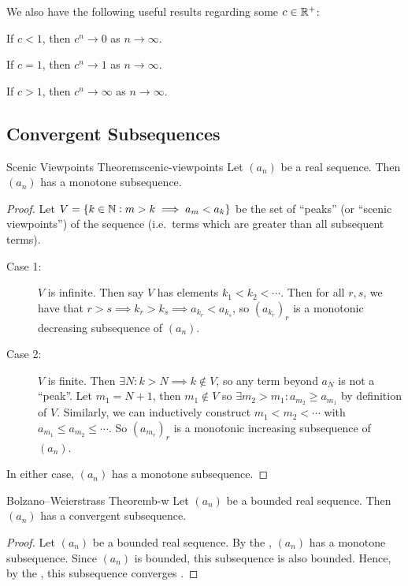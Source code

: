 \documentclass{styles/tufte}
\begin{document}
    \begin{lemma}{}{}
      We also have the following useful results regarding some $c \in \mathbb{R}^+$:
      \begin{romanenum}
        \item If $c < 1$, then $c^n \to 0$ as $n \to \infty$.
        \item If $c = 1$, then $c^n \to 1$ as $n \to \infty$.
        \item If $c > 1$, then $c^n \to \infty$ as $n \to \infty$.
      \end{romanenum}
    \end{lemma}

  
  
  \subsection{Convergent Subsequences}
    
    \begin{theorem}{Scenic Viewpoints Theorem}{scenic-viewpoints}
      Let $(a_n)$ be a real sequence. Then $(a_n)$ has a monotone subsequence.
    \end{theorem}
    \begin{proof}
      Let $V = \set{k \in \mathbb{N}: m > k \implies a_m < a_k}$ be the set of ``peaks'' (or ``scenic viewpoints'') of the sequence (i.e.~terms which are greater than all subsequent terms).
      \begin{description}
        \item[Case 1:] $V$ is infinite. Then say $V$ has elements $k_1 < k_2 < \cdots$. Then for all $r, s$, we have that $r > s \implies k_r > k_s \implies a_{k_r} < a_{k_s}$, so $(a_{k_r})_r$ is a monotonic decreasing subsequence of $(a_n)$.
        \item[Case 2:] $V$ is finite. Then $\exists N : k > N \implies k \notin V$, so any term beyond $a_N$ is not a ``peak''. Let $m_1 = N + 1$, then $m_1 \notin V$ so $\exists m_2 > m_1 : a_{m_2} \geqslant a_{m_1}$ by definition of $V$. Similarly, we can inductively construct $m_1 < m_2 < \cdots$ with $a_{m_1} \leqslant a_{m_2} \leqslant \cdots$. So $(a_{m_r})_r$ is a monotonic increasing subsequence of $(a_n)$.
      \end{description}
      In either case, $(a_n)$ has a monotone subsequence.
    \end{proof}
    
    \begin{theorem}{Bolzano--Weierstrass Theorem}{b-w}
      Let $(a_n)$ be a bounded real sequence. Then $(a_n)$ has a convergent subsequence.
    \end{theorem}
    \begin{proof}
      Let $(a_n)$ be a bounded real sequence. By the , $(a_n)$ has a monotone subsequence. Since $(a_n)$ is bounded, this subsequence is also bounded. Hence, by the , this subsequence converges  .
    \end{proof}
    
\end{document}
